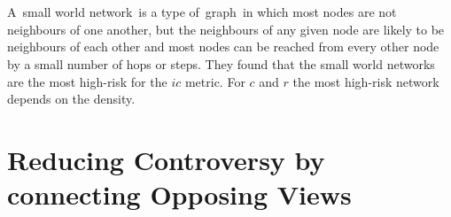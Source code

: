  \\
 \\
 A small world network is a type of graph in which most nodes are not neighbours of one another, but the neighbours of any given node are likely to be neighbours of each other and most nodes can be reached from every other node by a small number of hops or steps. They found that the small world networks are the most high-risk for the $ic$ metric. For $c$ and $r$ the most high-risk network depends on the density.\cite{chen}

\section{Reducing Controversy by connecting Opposing Views}
\label{sec:reducing}



